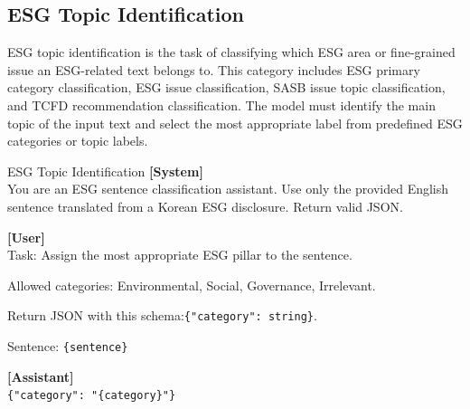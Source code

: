 \documentclass[11pt]{article}
\begin{document}
\subsection{ESG Topic Identification}
ESG topic identification is the task of classifying which ESG area or fine-grained issue an ESG-related text belongs to. This category includes ESG primary category classification, ESG issue classification, SASB issue topic classification, and TCFD recommendation classification. The model must identify the main topic of the input text and select the most appropriate label from predefined ESG categories or topic labels.

\begin{promptbox}{ESG Topic Identification}
\small
\textbf{[System]}\\
You are an ESG sentence classification assistant. Use only the provided English sentence translated from a Korean ESG disclosure. Return valid JSON.

\vspace{0.6em}
\textbf{[User]}\\
Task: Assign the most appropriate ESG pillar to the sentence.

\vspace{0.3em}
Allowed categories: Environmental, Social, Governance, Irrelevant.

\vspace{0.3em}
Return JSON with this schema:\newline \texttt{\{"category": string\}}.

\vspace{0.3em}
Sentence: \texttt{\{sentence\}}

\vspace{0.6em}
\textbf{[Assistant]}\\
\texttt{\{"category": "\{category\}"\}}
\end{promptbox}
\end{document}
